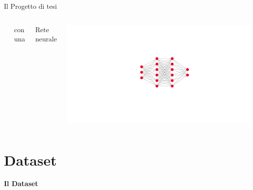 \documentclass{beamer}
\begin{document}
\begin{frame}{Il Progetto di tesi}
\begin{columns}[T]
\begin{flushleft}
{        }
      \end{flushleft}
      {
        \begin{block}{}
          \centering\small
          con una
        \end{block}
      }
      \begin{block}{}
        \centering
        Rete neurale
      \end{block}
      \parbox[t][][c]{\textwidth}{
        \vspace*{3ex}
        \centering
        \includegraphics[width=.9\textwidth]{./Images/nn_diagram.pdf}
      }
  \end{columns}
\end{frame}

\section{Dataset}
\begin{frame}
  \centering
  \Huge\bfseries
  Il Dataset
\end{frame}
\end{document}
